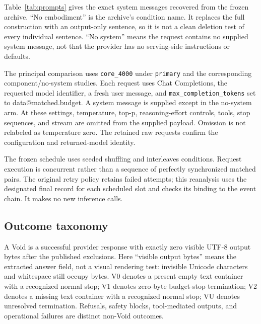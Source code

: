 \documentclass[11pt]{article}
\makeatletter
\newcommand{\D}[1]{\csname data@#1\endcsname}
\makeatother
\begin{document}
Table~\ref{tab:prompts} gives the exact system messages recovered from the frozen archive. ``No embodiment'' is the archive's condition name. It replaces the full construction with an output-only sentence, so it is not a clean deletion test of every individual sentence. ``No system'' means the request contains no supplied system message, not that the provider has no serving-side instructions or defaults.

\begin{table}[H]
\centering\small

\caption{Exact system conditions. User-message bytes are held fixed within each prompt comparison.}
\label{tab:prompts}
\end{table}

The principal comparison uses \texttt{core\_4000} under \texttt{primary} and the corresponding component/no-system studies. Each request uses Chat Completions, the requested model identifier, a fresh user message, and \texttt{max\_completion\_tokens} set to \D{matched.budget}. A system message is supplied except in the no-system arm. At these settings, temperature, top-p, reasoning-effort controls, tools, stop sequences, and stream are omitted from the supplied payload. Omission is not relabeled as temperature zero. The retained raw requests confirm the configuration and returned-model identity.

The frozen schedule uses seeded shuffling and interleaves conditions. Request execution is concurrent rather than a sequence of perfectly synchronized matched pairs. The original retry policy retains failed attempts; this reanalysis uses the designated final record for each scheduled slot and checks its binding to the event chain. It makes no new inference calls.

\subsection{Outcome taxonomy}
A Void is a successful provider response with exactly zero visible UTF-8 output bytes after the published exclusions. Here ``visible output bytes'' means the extracted answer field, not a visual rendering test: invisible Unicode characters and whitespace still occupy bytes. V0 denotes a present empty text container with a recognized normal stop; V1 denotes zero-byte budget-stop termination; V2 denotes a missing text container with a recognized normal stop; VU denotes unresolved termination. Refusals, safety blocks, tool-mediated outputs, and operational failures are distinct non-Void outcomes.
\end{document}
